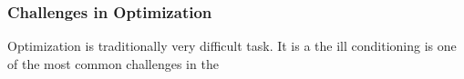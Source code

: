 \subsubsection{Challenges in Optimization}

Optimization is traditionally very difficult task. It is a 
the ill conditioning is one of the most common challenges in the 